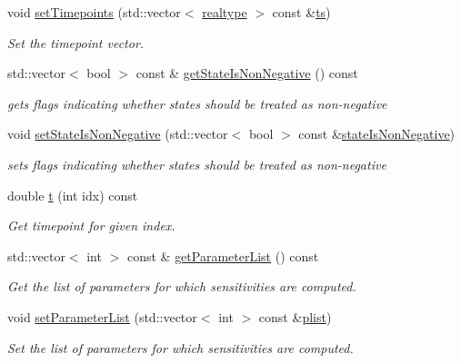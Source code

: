 \begin{DoxyCompactItemize}
void \mbox{\hyperlink{classamici_1_1_model_a50f9642f9bcb883dbd3925c85abc4c24}{set\+Timepoints}} (std\+::vector$<$ \mbox{\hyperlink{namespaceamici_a1bdce28051d6a53868f7ccbf5f2c14a3}{realtype}} $>$ const \&\mbox{\hyperlink{classamici_1_1_model_aa7014a80e7b102f85a10e3b9a480e8e5}{ts}})
\begin{DoxyCompactList}\small\item\em Set the timepoint vector. \end{DoxyCompactList}\item 
std\+::vector$<$ bool $>$ const  \& \mbox{\hyperlink{classamici_1_1_model_a25b1fc032e0065d80d8bd1041ab84bbf}{get\+State\+Is\+Non\+Negative}} () const
\begin{DoxyCompactList}\small\item\em gets flags indicating whether states should be treated as non-\/negative \end{DoxyCompactList}\item 
void \mbox{\hyperlink{classamici_1_1_model_a0a50693322a9383d8e98390d9894e841}{set\+State\+Is\+Non\+Negative}} (std\+::vector$<$ bool $>$ const \&\mbox{\hyperlink{classamici_1_1_model_a30f9edd35aad3ccaba31f67331881da5}{state\+Is\+Non\+Negative}})
\begin{DoxyCompactList}\small\item\em sets flags indicating whether states should be treated as non-\/negative \end{DoxyCompactList}\item 
double \mbox{\hyperlink{classamici_1_1_model_a711281d57e9710226face29151cc4641}{t}} (int idx) const
\begin{DoxyCompactList}\small\item\em Get timepoint for given index. \end{DoxyCompactList}\item 
std\+::vector$<$ int $>$ const  \& \mbox{\hyperlink{classamici_1_1_model_a94b6dfdb4883c916627b287e4d7b9b44}{get\+Parameter\+List}} () const
\begin{DoxyCompactList}\small\item\em Get the list of parameters for which sensitivities are computed. \end{DoxyCompactList}\item 
void \mbox{\hyperlink{classamici_1_1_model_a2afe974183e4bccaf746f6409941fe8f}{set\+Parameter\+List}} (std\+::vector$<$ int $>$ const \&\mbox{\hyperlink{classamici_1_1_model_a6ac0de1b7dfddbb4a480657f62573563}{plist}})
\begin{DoxyCompactList}\small\item\em Set the list of parameters for which sensitivities are computed. \end{DoxyCompactList}\item 

\end{DoxyCompactItemize}
